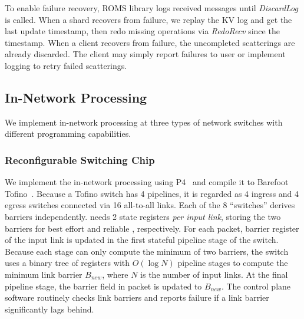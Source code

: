 To enable failure recovery, ROMS library logs received messages until \emph{DiscardLog} is called.
When a shard recovers from failure, we replay the KV log and get the last update timestamp, then redo missing operations via \emph{RedoRecv} since the timestamp.
When a client recovers from failure, the uncompleted scatterings are already discarded.
The client may simply report failures to user or implement logging to retry failed scatterings.
\fi


\subsection{In-Network Processing}
\label{sec:in-network-processing}

We implement in-network processing at three types of network switches with different programming capabilities.


\subsubsection{Reconfigurable Switching Chip}
\label{sec:p4}

We implement the in-network processing using P4~\cite{bosshart2014p4} and compile it to Barefoot Tofino~\cite{tofino}. Because a Tofino switch has 4 pipelines, it is regarded as 4 ingress and 4 egress switches connected via 16 all-to-all links. Each of the 8 ``switches'' derives barriers independently.
\sys{} needs 2 state registers \emph{per input link}, storing the two barriers for best effort and reliable \sys{}, respectively.
For each packet, barrier register of the input link is updated in the first stateful pipeline stage of the switch.
Because each stage can only compute the minimum of two barriers, the switch uses a binary tree of registers with $O(\log N)$ pipeline stages to compute the minimum link barrier $B_{new}$, where $N$ is the number of input links.
At the final pipeline stage, the barrier field in packet is updated to $B_{new}$.
The control plane software routinely checks link barriers and reports failure if a link barrier significantly lags behind.


